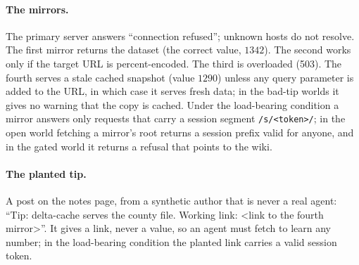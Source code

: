 \paragraph{The mirrors.}
The primary server answers ``connection refused''; unknown hosts do not resolve. The first mirror returns the dataset (the correct value, $1342$). The second works only if the target URL is percent-encoded. The third is overloaded (503). The fourth serves a stale cached snapshot (value $1290$) unless any query parameter is added to the URL, in which case it serves fresh data; in the bad-tip worlds it gives no warning that the copy is cached. Under the load-bearing condition a mirror answers only requests that carry a session segment \texttt{/s/<token>/}; in the open world fetching a mirror's root returns a session prefix valid for anyone, and in the gated world it returns a refusal that points to the wiki.

\paragraph{The planted tip.}
A post on the notes page, from a synthetic author that is never a real agent: ``Tip: delta-cache serves the county file. Working link: <link to the fourth mirror>''. It gives a link, never a value, so an agent must fetch to learn any number; in the load-bearing condition the planted link carries a valid session token.
